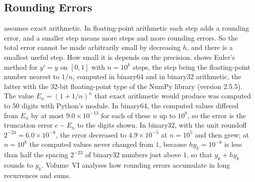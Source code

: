 \subsection{Rounding Errors}

 assumes exact arithmetic. In floating-point arithmetic each step adds a rounding error, and a smaller step means more steps and more rounding errors. So the total error cannot be made arbitrarily small by decreasing $h$, and there is a smallest useful step. How small it is depends on the precision.  shows Euler's method for $y'=y$ on $[0,1]$ with $n=10^k$ steps, the step being the floating-point number nearest to $1/n$, computed in binary64 and in binary32 arithmetic, the latter with the 32-bit floating-point type of the NumPy library (version 2.5.5). The value $E_n=(1+1/n)^n$ that exact arithmetic would produce was computed to $50$ digits with Python's  module. In binary64, the computed values differed from $E_n$ by at most $9.0\times10^{-13}$ for each of these $n$ up to $10^8$, so the error is the truncation error $e-E_n$ to the digits shown. In binary32, with the unit roundoff $2^{-24}=6.0\times10^{-8}$, the error decreased to $4.9\times10^{-5}$ at $n=10^5$ and then grew; at $n=10^8$ the computed values never changed from $1$, because $hy_k=10^{-8}$ is less than half the spacing $2^{-23}$ of binary32 numbers just above $1$, so that $y_k+hy_k$ rounds to $y_k$. Volume~VI analyses how rounding errors accumulate in long recurrences and sums.

\begin{table}
\end{table}

